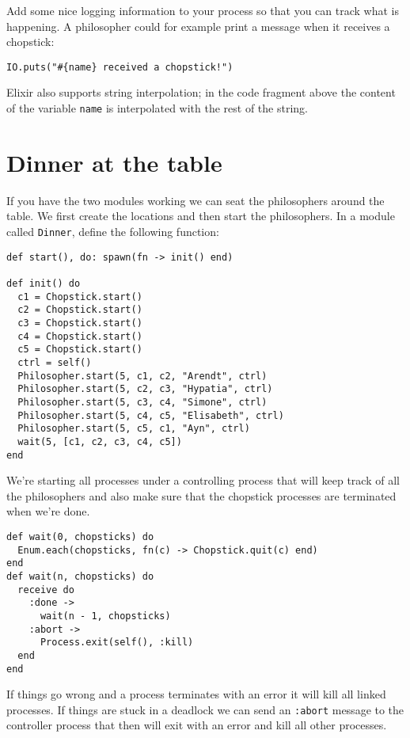 \documentclass[a4paper,11pt]{article}
\begin{document}
Add some nice logging information to your process so that you can
track what is happening. A philosopher could for example print a
message when it receives a chopstick:

\begin{verbatim}
IO.puts("#{name} received a chopstick!")
\end{verbatim}

Elixir also supports string interpolation; in the code fragment above
the content of the variable {\tt name} is interpolated with the rest
of the string.



\section{Dinner at the table}

If you have the two modules working we can seat the philosophers
around the table. We first create the locations and then start the
philosophers. In a module called {\tt Dinner}, define the following
function:

\begin{verbatim}
def start(), do: spawn(fn -> init() end)

def init() do
  c1 = Chopstick.start()    
  c2 = Chopstick.start()
  c3 = Chopstick.start()
  c4 = Chopstick.start()
  c5 = Chopstick.start()
  ctrl = self()
  Philosopher.start(5, c1, c2, "Arendt", ctrl)
  Philosopher.start(5, c2, c3, "Hypatia", ctrl)
  Philosopher.start(5, c3, c4, "Simone", ctrl)
  Philosopher.start(5, c4, c5, "Elisabeth", ctrl)
  Philosopher.start(5, c5, c1, "Ayn", ctrl)
  wait(5, [c1, c2, c3, c4, c5])
end
\end{verbatim}

We're starting all processes under a controlling process that will keep
track of all the philosophers and also make sure that the chopstick
processes are terminated when we're done.

\begin{verbatim}
def wait(0, chopsticks) do
  Enum.each(chopsticks, fn(c) -> Chopstick.quit(c) end)
end
def wait(n, chopsticks) do
  receive do
    :done ->
      wait(n - 1, chopsticks)
    :abort ->
      Process.exit(self(), :kill)
  end
end
\end{verbatim}

If things go wrong and a process terminates with an error it will kill
all linked processes. If things are stuck in a deadlock we can send
an {\tt :abort} message to the controller process that then will exit
with an error and kill all other processes.
\end{document}
